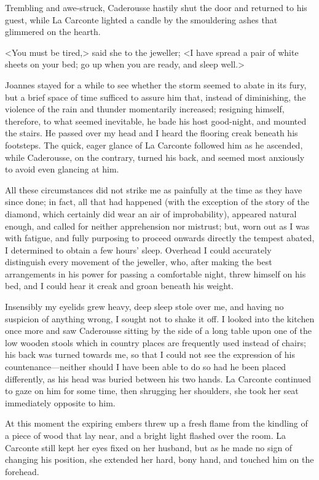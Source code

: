  Trembling and awe-struck, Caderousse hastily shut the door and returned to his guest, while La Carconte lighted a candle by the smouldering ashes that glimmered on the hearth. 

 <You must be tired,> said she to the jeweller; <I have spread a pair of white sheets on your bed; go up when you are ready, and sleep well.> 

 Joannes stayed for a while to see whether the storm seemed to abate in its fury, but a brief space of time sufficed to assure him that, instead of diminishing, the violence of the rain and thunder momentarily increased; resigning himself, therefore, to what seemed inevitable, he bade his host good-night, and mounted the stairs. He passed over my head and I heard the flooring creak beneath his footsteps. The quick, eager glance of La Carconte followed him as he ascended, while Caderousse, on the contrary, turned his back, and seemed most anxiously to avoid even glancing at him. 

 All these circumstances did not strike me as painfully at the time as they have since done; in fact, all that had happened (with the exception of the story of the diamond, which certainly did wear an air of improbability), appeared natural enough, and called for neither apprehension nor mistrust; but, worn out as I was with fatigue, and fully purposing to proceed onwards directly the tempest abated, I determined to obtain a few hours' sleep. Overhead I could accurately distinguish every movement of the jeweller, who, after making the best arrangements in his power for passing a comfortable night, threw himself on his bed, and I could hear it creak and groan beneath his weight. 

 Insensibly my eyelids grew heavy, deep sleep stole over me, and having no suspicion of anything wrong, I sought not to shake it off. I looked into the kitchen once more and saw Caderousse sitting by the side of a long table upon one of the low wooden stools which in country places are frequently used instead of chairs; his back was turned towards me, so that I could not see the expression of his countenance—neither should I have been able to do so had he been placed differently, as his head was buried between his two hands. La Carconte continued to gaze on him for some time, then shrugging her shoulders, she took her seat immediately opposite to him. 

 At this moment the expiring embers threw up a fresh flame from the kindling of a piece of wood that lay near, and a bright light flashed over the room. La Carconte still kept her eyes fixed on her husband, but as he made no sign of changing his position, she extended her hard, bony hand, and touched him on the forehead.  
 
